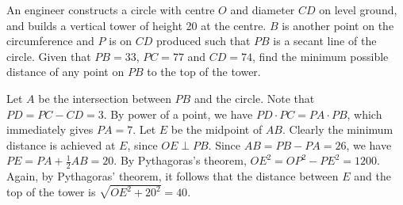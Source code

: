 \begin{question}[40]\label{A::2024-S-1-16}
    An engineer constructs a circle with centre $O$ and diameter $CD$ on level ground, and builds a vertical tower of height 20 at the centre. $B$ is another point on the circumference and $P$ is on $CD$ produced such that $PB$ is a secant line of the circle. Given that $PB = 33$, $PC = 77$ and $CD = 74$, find the minimum possible distance of any point on $PB$ to the top of the tower.

    \begin{center}
    \end{center}
\end{question}
\begin{center}
\end{center}
\begin{solution*}
    Let $A$ be the intersection between $PB$ and the circle. Note that $PD = PC - CD = 3$. By power of a point, we have $PD \cdot PC = PA \cdot PB$, which immediately gives $PA = 7$. Let $E$ be the midpoint of $AB$. Clearly the minimum distance is achieved at $E$, since $OE \perp PB$. Since $AB = PB - PA = 26$, we have $PE = PA + \frac12 AB = 20$. By Pythagoras's theorem, $OE^2 = OP^2 - PE^2 = 1200$. Again, by Pythagoras' theorem, it follows that the distance between $E$ and the top of the tower is $\sqrt{OE^2 + 20^2} = 40$.
\end{solution*}


